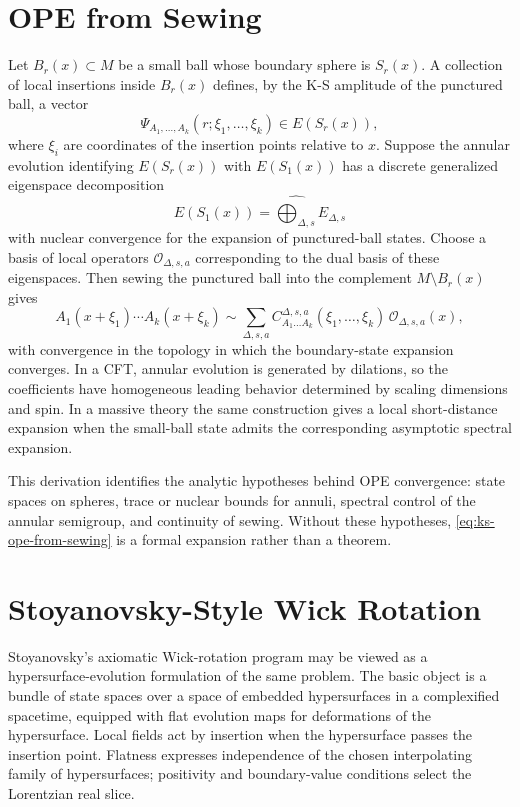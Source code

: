 \section{OPE from Sewing}

Let \(B_r(x)\subset M\) be a small ball whose boundary sphere is \(S_r(x)\).
A collection of local insertions inside \(B_r(x)\) defines, by the K-S
amplitude of the punctured ball, a vector
\[
  \Psi_{A_1,\ldots,A_k}(r;\xi_1,\ldots,\xi_k)\in E(S_r(x)),
\]
where \(\xi_i\) are coordinates of the insertion points relative to \(x\).
Suppose the annular evolution identifying \(E(S_r(x))\) with \(E(S_1(x))\)
has a discrete generalized eigenspace decomposition
\[
  E(S_1(x))=\widehat{\bigoplus_{\Delta,s}} E_{\Delta,s}
\]
with nuclear convergence for the expansion of punctured-ball states.  Choose
a basis of local operators \(\mathcal O_{\Delta,s,a}\) corresponding to the
dual basis of these eigenspaces.  Then sewing the punctured ball into the
complement \(M\setminus B_r(x)\) gives
\begin{equation}
  A_1(x+\xi_1)\cdots A_k(x+\xi_k)
  \sim
  \sum_{\Delta,s,a}
  C^{\Delta,s,a}_{A_1\ldots A_k}(\xi_1,\ldots,\xi_k)\,
  \mathcal O_{\Delta,s,a}(x),
  \label{eq:ks-ope-from-sewing}
\end{equation}
with convergence in the topology in which the boundary-state expansion
converges.  In a CFT, annular evolution is generated by dilations, so the
coefficients have homogeneous leading behavior determined by scaling
dimensions and spin.  In a massive theory the same construction gives a local
short-distance expansion when the small-ball state admits the corresponding
asymptotic spectral expansion.

This derivation identifies the analytic hypotheses behind OPE convergence:
state spaces on spheres, trace or nuclear bounds for annuli, spectral
control of the annular semigroup, and continuity of sewing.  Without these
hypotheses, \eqref{eq:ks-ope-from-sewing} is a formal expansion rather than a
theorem.

\section{Stoyanovsky-Style Wick Rotation}

Stoyanovsky's axiomatic Wick-rotation program may be viewed as a
hypersurface-evolution formulation of the same problem.  The basic object is
a bundle of state spaces over a space of embedded hypersurfaces in a
complexified spacetime, equipped with flat evolution maps for deformations of
the hypersurface.  Local fields act by insertion when the hypersurface passes
the insertion point.  Flatness expresses independence of the chosen
interpolating family of hypersurfaces; positivity and boundary-value
conditions select the Lorentzian real slice.

